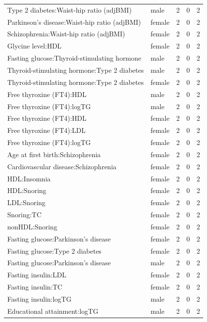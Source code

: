\begin{table}[ht]
\begin{tabular}{llrrr}
  Type 2 diabetes:Waist-hip ratio (adjBMI) & male &   2 &   0 &   2 \\ 
  Parkinson's disease:Waist-hip ratio (adjBMI) & female &   2 &   0 &   2 \\ 
  Schizophrenia:Waist-hip ratio (adjBMI) & female &   2 &   0 &   2 \\ 
  Glycine level:HDL & female &   2 &   0 &   2 \\ 
  Fasting glucose:Thyroid-stimulating hormone & male &   2 &   0 &   2 \\ 
  Thyroid-stimulating hormone:Type 2 diabetes & male &   2 &   0 &   2 \\ 
  Thyroid-stimulating hormone:Type 2 diabetes & female &   2 &   0 &   2 \\ 
  Free thyroxine (FT4):HDL & male &   2 &   0 &   2 \\ 
  Free thyroxine (FT4):logTG & male &   2 &   0 &   2 \\ 
  Free thyroxine (FT4):HDL & female &   2 &   0 &   2 \\ 
  Free thyroxine (FT4):LDL & female &   2 &   0 &   2 \\ 
  Free thyroxine (FT4):logTG & female &   2 &   0 &   2 \\ 
  Age at first birth:Schizophrenia & female &   2 &   0 &   2 \\ 
  Cardiovascular disease:Schizophrenia & female &   2 &   0 &   2 \\ 
  HDL:Insomnia & female &   2 &   0 &   2 \\ 
  HDL:Snoring & female &   2 &   0 &   2 \\ 
  LDL:Snoring & female &   2 &   0 &   2 \\ 
  Snoring:TC & female &   2 &   0 &   2 \\ 
  nonHDL:Snoring & female &   2 &   0 &   2 \\ 
  Fasting glucose:Parkinson's disease & female &   2 &   0 &   2 \\ 
  Fasting glucose:Type 2 diabetes & female &   2 &   0 &   2 \\ 
  Fasting glucose:Parkinson's disease & male &   2 &   0 &   2 \\ 
  Fasting insulin:LDL & female &   2 &   0 &   2 \\ 
  Fasting insulin:TC & female &   2 &   0 &   2 \\ 
  Fasting insulin:logTG & male &   2 &   0 &   2 \\ 
  Educational attainment:logTG & male &   2 &   0 &   2 \\ 

\end{tabular}
\end{table}
